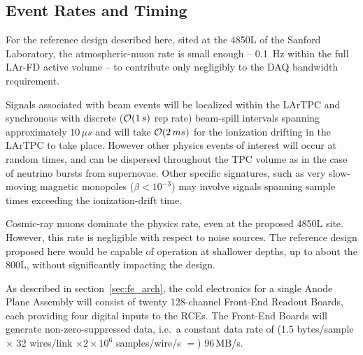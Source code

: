 \subsection{Event Rates and Timing}
\label{sec:v5-daq-assumptions}

For the reference design described here, sited at the 4850L of the Sanford Laboratory, the 
atmospheric-muon rate is small enough -- 0.1~Hz within the full LAr-FD active 
volume -- to contribute only negligibly to the DAQ bandwidth requirement.

Signals associated with beam events will be localized within the
LArTPC and synchronous with discrete (${\cal O} (1\,s)$ rep rate)
beam-spill intervals spanning approximately $10\,\mu s$ and will take
${\cal O} (2\,ms)$ for the ionization drifting in the LArTPC to take place.
However other physics events of interest will occur at random times,
and can be dispersed throughout the TPC volume as in the case of
neutrino bursts from supernovae.  Other specific signatures, such as
very slow-moving magnetic monopoles ($\beta < 10^{-3}$) may involve
signals spanning sample times exceeding the ionization-drift time.

Cosmic-ray muons dominate the physics rate, even at the proposed 4850L
site.  However, this rate is negligible with respect to noise sources.
The reference design proposed here would be capable of operation at
shallower depths, up to about the 800L, without significantly impacting
the design.

As described in section~\ref{sec:fe_arch}, the cold electronics for a
single Anode Plane Assembly will consist of twenty 128-channel
Front-End Readout Boards, each providing four digital inputs to the
RCEs.  The Front-End Boards will generate non-zero-suppressed data,
i.e.\ a constant data rate of (1.5 bytes/sample $\times$ 32 wires/link
$\times 2 \times 10^6$ samples/wire/s $=$) 96\,MB/s.

